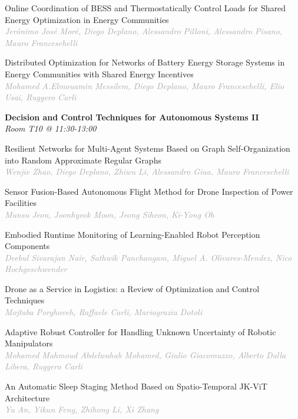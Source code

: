 \begin{multicols*}{2}
\small Online Coordination of BESS and Thermostatically Control Loads for Shared Energy Optimization in Energy Communities\\ 
\footnotesize \textcolor{darkgray}{\textit{Jerónimo José Moré, Diego  Deplano, Alessandro  Pilloni, Alessandro  Pisano, Mauro  Franceschelli}}

\small Distributed Optimization for Networks of Battery Energy Storage Systems in Energy Communities with Shared Energy Incentives\\ 
\footnotesize \textcolor{darkgray}{\textit{Mohamed A.Elmouamin Messilem, Diego  Deplano, Mauro  Franceschelli, Elio  Usai, Ruggero  Carli}}

\normalsize \textbf{Decision and Control Techniques for Autonomous Systems II}\\
\small \textit{Room T10 @ 11:30-13:00}

\small Resilient Networks for Multi-Agent Systems Based on Graph Self-Organization into Random Approximate Regular Graphs\\ 
\footnotesize \textcolor{darkgray}{\textit{Wenjie Zhao, Diego  Deplano, Zhiwu  Li, Alessandro  Giua, Mauro  Franceschelli}}

\small Sensor Fusion-Based Autonomous Flight Method for Drone Inspection of Power Facilities\\ 
\footnotesize \textcolor{darkgray}{\textit{Munsu Jeon, Joonhyeok  Moon, Jeong  Siheon, Ki-Yong  Oh}}

\small Embodied Runtime Monitoring of Learning-Enabled Robot Perception Components\\ 
\footnotesize \textcolor{darkgray}{\textit{Deebul Sivarajan Nair, Sathwik  Panchangam, Miguel A.  Olivares-Mendez, Nico  Hochgeschwender}}

\small Drone as a Service in Logistics: a Review of Optimization and Control Techniques\\ 
\footnotesize \textcolor{darkgray}{\textit{Mojtaba Porghoveh, Raffaele  Carli, Mariagrazia  Dotoli}}

\small Adaptive Robust Controller for Handling Unknown Uncertainty of Robotic Manipulators\\ 
\footnotesize \textcolor{darkgray}{\textit{Mohamed Mahmoud Abdelwahab Mohamed, Giulio  Giacomuzzo, Alberto  Dalla Libera, Ruggero  Carli}}

\small An Automatic Sleep Staging Method Based on Spatio-Temporal JK-ViT Architecture\\ 
\footnotesize \textcolor{darkgray}{\textit{Yu An, Yikun  Feng, Zhihong  Li, Xi  Zhang}}


\end{multicols*}
